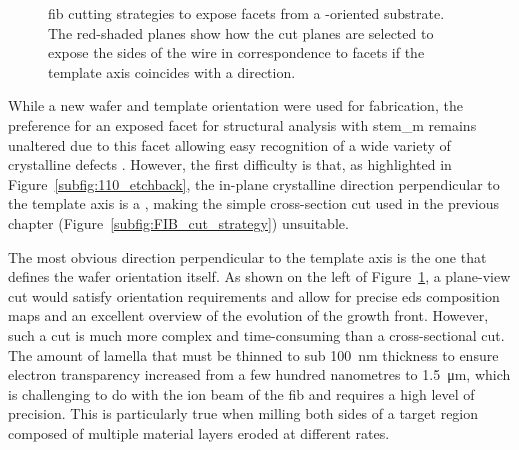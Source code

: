 \begin{figure}
    \caption{\acs{fib} cutting strategies to expose  facets from a \hkl[1 1 0]-oriented substrate. The red-shaded planes show how the cut planes are selected to expose the sides of the wire in correspondence to  facets if the template axis coincides with a  direction.}
    \label{fig:110_FIB}
\end{figure}

While a new  wafer and  template orientation were used for fabrication, the preference for an exposed  facet for structural analysis with \acs{stem_m} remains unaltered due to this facet allowing easy recognition of a wide variety of crystalline defects \cite{Dasilva2017}. However, the first difficulty is that, as highlighted in Figure~\ref{subfig:110_etchback}, the in-plane crystalline direction perpendicular to the  template axis is a , making the simple cross-section cut used in the previous chapter (Figure~\ref{subfig:FIB_cut_strategy}) unsuitable.

The most obvious  direction perpendicular to the  template axis is the one that defines the wafer orientation itself. As shown on the left of Figure~\ref{fig:110_FIB}, a plane-view cut would satisfy orientation requirements and allow for precise \acf{eds} composition maps and an excellent overview of the evolution of the growth front. However, such a cut is much more complex and time-consuming than a cross-sectional cut. The amount of lamella that must be thinned to sub \qty{100}{\nano\metre} thickness to ensure electron transparency increased from a few hundred nanometres to \qty{1.5}{\micro\metre}, which is challenging to do with the ion beam of the \acs{fib} and requires a high level of precision. This is particularly true when milling both sides of a target region composed of multiple material layers eroded at different rates.

